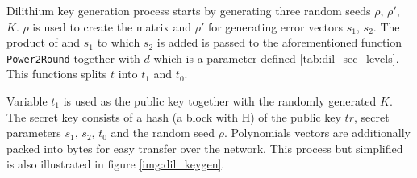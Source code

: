 Dilithium key generation process starts by generating three random seeds $\rho$, $\rho'$, $K$. $\rho$ is used to create the matrix  and $\rho'$ for generating error vectors $s_1$, $s_2$. The product of  and $s_1$ to which $s_2$ is added is passed to the aforementioned function \texttt{Power2Round} together with $d$ which is a parameter defined \ref{tab:dil_sec_levels}. This functions splits $t$ into $t_1$ and $t_0$.

Variable $t_1$ is used as the public key together with the randomly generated $K$. The secret key consists of a hash (a block with H) of the public key $tr$, secret parameters $s_1$, $s_2$, $t_0$ and the random seed $\rho$. Polynomials vectors are additionally packed into bytes for easy transfer over the network. This process but simplified is also illustrated in figure \ref{img:dil_keygen}.

